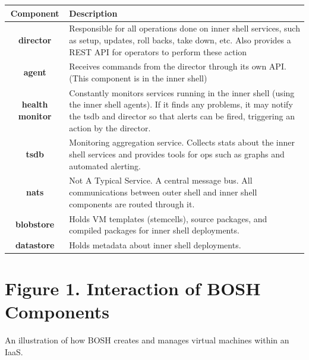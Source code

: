 \begin{table}[htbp]
\begin{minipage}{\linewidth}
\setlength{\tymax}{0.5\linewidth}
\centering
\small
\begin{tabulary}{\textwidth}{@{}CL@{}} \toprule
Component&Description\\
\midrule
\textbf{director}&Responsible for all operations done on inner shell services, such as setup, updates, roll backs, take down, etc. Also provides a REST API for operators to perform these action\\
\textbf{agent}&Receives commands from the director through its own API. (This component is in the inner shell)\\
\textbf{health monitor}&Constantly monitors services running in the inner shell (using the inner shell agents). If it finds any problems, it may notify the tsdb and director so that alerts can be fired, triggering an action by the director.\\
\textbf{tsdb}&Monitoring aggregation service. Collects stats about the inner shell services and provides tools for ops such as graphs and automated alerting.\\
\textbf{nats}&Not A Typical Service. A central message bus. All communications between outer shell and inner shell components are routed through it.\\
\textbf{blobstore}&Holds VM templates (stemcells), source packages, and compiled packages for inner shell deployments.\\

\midrule
\textbf{datastore}&Holds metadata about inner shell deployments.\\

\bottomrule

\end{tabulary}
\end{minipage}
\end{table}


\section{Figure 1. Interaction of BOSH Components}
\label{figure1.interactionofboshcomponents}

An illustration of how BOSH creates and manages virtual machines within an IaaS.

